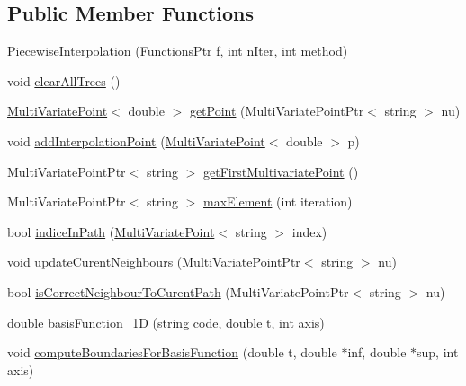 \subsection*{Public Member Functions}
\begin{DoxyCompactItemize}
\item 
\hyperlink{class_piecewise_interpolation_a163e201afb9f7f73e19bc8273895444c}{Piecewise\+Interpolation} (Functions\+Ptr f, int n\+Iter, int method)
\item 
void \hyperlink{class_piecewise_interpolation_a2470a7df8440b7c8b8394392f16773a0}{clear\+All\+Trees} ()
\item 
\hyperlink{class_multi_variate_point}{Multi\+Variate\+Point}$<$ double $>$ \hyperlink{class_piecewise_interpolation_a12e8daf16807946c6a030844ac7bfdb1}{get\+Point} (Multi\+Variate\+Point\+Ptr$<$ string $>$ nu)
\item 
void \hyperlink{class_piecewise_interpolation_a7f07e4dee313c9da21876b286af62336}{add\+Interpolation\+Point} (\hyperlink{class_multi_variate_point}{Multi\+Variate\+Point}$<$ double $>$ p)
\item 
Multi\+Variate\+Point\+Ptr$<$ string $>$ \hyperlink{class_piecewise_interpolation_adc4d6a1ada2e8f4d3f2176d4ebcb31a4}{get\+First\+Multivariate\+Point} ()
\item 
Multi\+Variate\+Point\+Ptr$<$ string $>$ \hyperlink{class_piecewise_interpolation_a0c0c51e2eed0a0f7155bc223adf30cf8}{max\+Element} (int iteration)
\item 
bool \hyperlink{class_piecewise_interpolation_ac9a4902bf9202aa7a0b84260d2380898}{indice\+In\+Path} (\hyperlink{class_multi_variate_point}{Multi\+Variate\+Point}$<$ string $>$ index)
\item 
void \hyperlink{class_piecewise_interpolation_a4696cd4a9be92614779f53d17acd0ad1}{update\+Curent\+Neighbours} (Multi\+Variate\+Point\+Ptr$<$ string $>$ nu)
\item 
bool \hyperlink{class_piecewise_interpolation_ac0b6901bd4b71cc35d3b121f31b4bc53}{is\+Correct\+Neighbour\+To\+Curent\+Path} (Multi\+Variate\+Point\+Ptr$<$ string $>$ nu)
\item 
double \hyperlink{class_piecewise_interpolation_abd0d1ee7206ec28ce53b57a01d430458}{basis\+Function\+\_\+1D} (string code, double t, int axis)
\item 
void \hyperlink{class_piecewise_interpolation_a5d45e9742f492e96686c51769766eed1}{compute\+Boundaries\+For\+Basis\+Function} (double t, double $\ast$inf, double $\ast$sup, int axis)
\end{DoxyCompactItemize}
